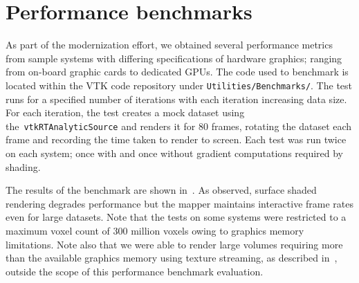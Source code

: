 \section{Performance benchmarks}
\label{performance-benchmarks}
As part of the modernization effort, we obtained several performance metrics
from sample systems with differing specifications of hardware graphics; ranging
from on-board graphic cards to dedicated GPUs. The code used to benchmark is
located within the VTK code repository under \texttt{Utilities/Benchmarks/}. The
test runs for a specified number of iterations with each iteration increasing
data size. For each iteration, the test creates a mock dataset using
the~\texttt{vtkRTAnalyticSource} and renders it for 80 frames, rotating the
dataset each frame and recording the time taken to render to screen.  Each test
was run twice on each system; once with and once without gradient computations
required by shading.

The results of the benchmark are shown in~. As observed,
surface shaded rendering degrades performance but the mapper maintains
interactive frame rates even for large datasets. Note that the tests on some
systems were restricted to a maximum voxel count of 300 million voxels owing to
graphics memory limitations. Note also that we were able to render large volumes
requiring more than the available graphics memory using texture streaming, as
described in~, outside the scope of this performance
benchmark evaluation.

